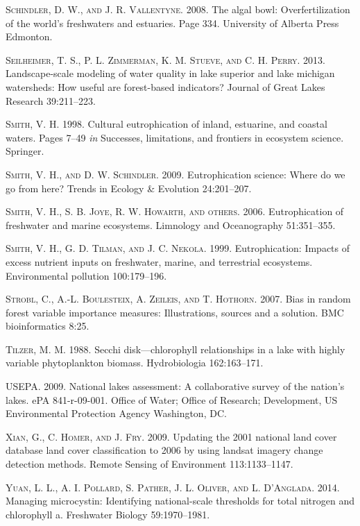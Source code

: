 \documentclass[11pt,]{article}
\begin{document}
\textsc{Schindler, D. W., and J. R. Vallentyne}. 2008. The algal bowl:
Overfertilization of the world's freshwaters and estuaries. Page 334.
University of Alberta Press Edmonton.

\textsc{Seilheimer, T. S., P. L. Zimmerman, K. M. Stueve, and C. H.
Perry}. 2013. Landscape-scale modeling of water quality in lake superior
and lake michigan watersheds: How useful are forest-based indicators?
Journal of Great Lakes Research 39:211--223.

\textsc{Smith, V. H.} 1998. Cultural eutrophication of inland,
estuarine, and coastal waters. Pages 7--49 \emph{in} Successes,
limitations, and frontiers in ecosystem science. Springer.

\textsc{Smith, V. H., and D. W. Schindler}. 2009. Eutrophication
science: Where do we go from here? Trends in Ecology \& Evolution
24:201--207.

\textsc{Smith, V. H., S. B. Joye, R. W. Howarth, and others}. 2006.
Eutrophication of freshwater and marine ecosystems. Limnology and
Oceanography 51:351--355.

\textsc{Smith, V. H., G. D. Tilman, and J. C. Nekola}. 1999.
Eutrophication: Impacts of excess nutrient inputs on freshwater, marine,
and terrestrial ecosystems. Environmental pollution 100:179--196.

\textsc{Strobl, C., A.-L. Boulesteix, A. Zeileis, and T. Hothorn}. 2007.
Bias in random forest variable importance measures: Illustrations,
sources and a solution. BMC bioinformatics 8:25.

\textsc{Tilzer, M. M.} 1988. Secchi disk---chlorophyll relationships in
a lake with highly variable phytoplankton biomass. Hydrobiologia
162:163--171.

\textsc{USEPA}. 2009. National lakes assessment: A collaborative survey
of the nation's lakes. ePA 841-r-09-001. Office of Water; Office of
Research; Development, US Environmental Protection Agency Washington,
DC.

\textsc{Xian, G., C. Homer, and J. Fry}. 2009. Updating the 2001
national land cover database land cover classification to 2006 by using
landsat imagery change detection methods. Remote Sensing of Environment
113:1133--1147.

\textsc{Yuan, L. L., A. I. Pollard, S. Pather, J. L. Oliver, and L.
D'Anglada}. 2014. Managing microcystin: Identifying national-scale
thresholds for total nitrogen and chlorophyll a. Freshwater Biology
59:1970--1981.
\end{document}
